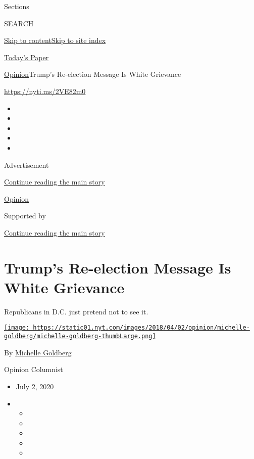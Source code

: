 Sections

SEARCH

\protect\hyperlink{site-content}{Skip to
content}\protect\hyperlink{site-index}{Skip to site index}

\href{https://myaccount.nytimes.com/auth/login?response_type=cookie\&client_id=vi}{}

\href{https://www.nytimes.com/section/todayspaper}{Today's Paper}

\href{/section/opinion}{Opinion}\textbar{}Trump's Re-election Message Is
White Grievance

\href{https://nyti.ms/2VE82m0}{https://nyti.ms/2VE82m0}

\begin{itemize}
\item
\item
\item
\item
\item
\end{itemize}

Advertisement

\protect\hyperlink{after-top}{Continue reading the main story}

\href{/section/opinion}{Opinion}

Supported by

\protect\hyperlink{after-sponsor}{Continue reading the main story}

\hypertarget{trumps-re-election-message-is-white-grievance}{%
\section{Trump's Re-election Message Is White
Grievance}\label{trumps-re-election-message-is-white-grievance}}

Republicans in D.C. just pretend not to see it.

\href{https://www.nytimes.com/by/michelle-goldberg}{\texttt{[image: https://static01.nyt.com/images/2018/04/02/opinion/michelle-goldberg/michelle-goldberg-thumbLarge.png]}}

By \href{https://www.nytimes.com/by/michelle-goldberg}{Michelle
Goldberg}

Opinion Columnist

\begin{itemize}
\item
  July 2, 2020
\item
  \begin{itemize}
  \item
  \item
  \item
  \item
  \item
  \end{itemize}
\end{itemize}

